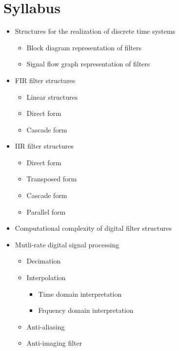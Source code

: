 \documentclass[../course]{subfiles}
\begin{document}
\section{Syllabus}

\begin{itemize}

    \item Structures for the realization of discrete time systems

        \begin{itemize}

            \item Block diagram representation of filters
            \item Signal flow graph representation of filters

        \end{itemize}

    \item FIR filter structures

        \begin{itemize}

            \item Linear structures
            \item Direct form
            \item Cascade form

        \end{itemize}

    \item IIR filter structures

        \begin{itemize}

            \item Direct form
            \item Transposed form
            \item Cascade form
            \item Parallel form

        \end{itemize}

    \item Computational complexity of digital filter structures
    \item Mutli-rate digital signal processing

        \begin{itemize}

            \item Decimation
            \item Interpolation

                \begin{itemize}

                    \item Time domain interpretation
                    \item Frquency domain interpretation

                \end{itemize}

            \item Anti-aliasing
            \item Anti-imaging filter

        \end{itemize}

\end{itemize}
\end{document}
